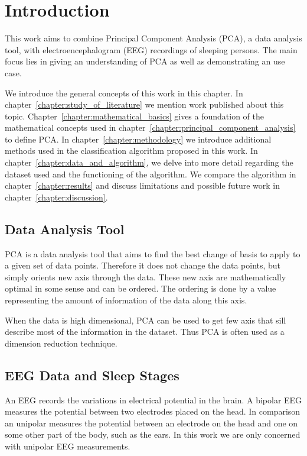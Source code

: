 \chapter{Introduction}
\label{chapter:introduction}

This work aims to combine Principal Component Analysis (PCA), a data analysis tool, with electroencephalogram (EEG) recordings of sleeping persons. The main focus lies in giving an understanding of PCA as well as demonstrating an use case.

We introduce the general concepts of this work in this chapter. In chapter~\ref{chapter:study_of_literature} we mention work published about this topic. Chapter~\ref{chapter:mathematical_basics} gives a foundation of the mathematical concepts used in chapter~\ref{chapter:principal_component_analysis} to define PCA. In chapter~\ref{chapter:methodology} we introduce additional methods used in the classification algorithm proposed in this work. In chapter~\ref{chapter:data_and_algorithm}, we delve into more detail regarding the dataset used and the functioning of the algorithm. We compare the algorithm in chapter~\ref{chapter:results} and discuss limitations and possible future work in chapter~\ref{chapter:discussion}.

\section{Data Analysis Tool}

PCA is a data analysis tool that aims to find the best change of basis to apply to a given set of data points. Therefore it does not change the data points, but simply orients new axis through the data. These new axis are mathematically optimal in some sense and can be ordered. The ordering is done by a value representing the amount of information of the data along this axis.

When the data is high dimensional, PCA can be used to get few axis that sill describe most of the information in the dataset. Thus PCA is often used as a dimension reduction technique.


\section{EEG Data and Sleep Stages}
\label{sec:eeg_data_and_sleep_stages}

An EEG records the variations in electrical potential in the brain. A bipolar EEG measures the potential between two electrodes placed on the head. In comparison an unipolar measures the potential between an electrode on the head and one on some other part of the body, such as the ears. In this work we are only concerned with unipolar EEG measurements.

